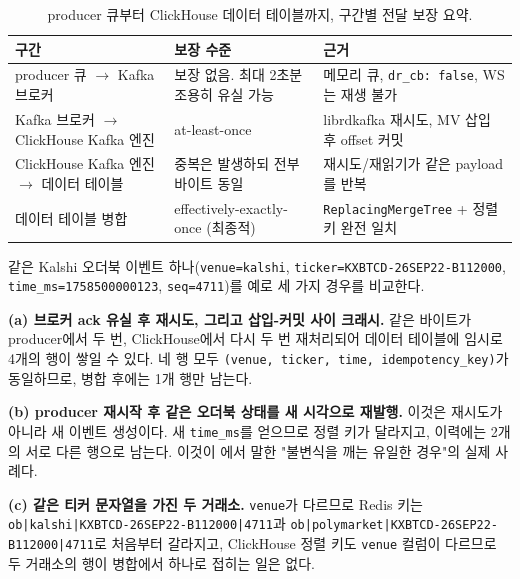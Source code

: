 \begin{table}[htbp]
  \centering
  \small
  \begin{tabularx}{\linewidth}{@{}lXX@{}}
    \toprule
    구간 & 보장 수준 & 근거 \\
    \midrule
    producer 큐 $\to$ Kafka 브로커 & 보장 없음. 최대 2초분 조용히 유실 가능 &
      메모리 큐, \texttt{dr\_cb: false}, WS는 재생 불가 \\
    Kafka 브로커 $\to$ ClickHouse Kafka 엔진 & at-least-once &
      librdkafka 재시도, MV 삽입 후 offset 커밋 \\
    ClickHouse Kafka 엔진 $\to$ 데이터 테이블 & 중복은 발생하되 전부 바이트 동일 &
      재시도/재읽기가 같은 payload를 반복 \\
    데이터 테이블 병합 & effectively-exactly-once (최종적) &
      \texttt{ReplacingMergeTree} + 정렬 키 완전 일치 \\
    \bottomrule
  \end{tabularx}
  \caption{producer 큐부터 ClickHouse 데이터 테이블까지, 구간별 전달 보장 요약.}
  \label{tab:delivery-summary}
\end{table}

\begin{example}
\label{ex:delivery-scenarios}
같은 Kalshi 오더북 이벤트 하나(\texttt{venue=kalshi},
\texttt{ticker=KXBTCD-26SEP22-B112000}, \texttt{time\_ms=1758500000123},
\texttt{seq=4711})를 예로 세 가지 경우를 비교한다.

\textbf{(a) 브로커 ack 유실 후 재시도, 그리고 삽입-커밋 사이 크래시.} 같은 바이트가
producer에서 두 번, ClickHouse에서 다시 두 번 재처리되어 데이터 테이블에 임시로
4개의 행이 쌓일 수 있다. 네 행 모두 \texttt{(venue, ticker, time,
idempotency\_key)}가 동일하므로, 병합 후에는 1개 행만 남는다.

\textbf{(b) producer 재시작 후 같은 오더북 상태를 새 시각으로 재발행.} 이것은
재시도가 아니라 새 이벤트 생성이다. 새 \texttt{time\_ms}를 얻으므로 정렬 키가
달라지고, 이력에는 2개의 서로 다른 행으로 남는다. 이것이
에서 말한 "불변식을 깨는 유일한 경우"의 실제 사례다.

\textbf{(c) 같은 티커 문자열을 가진 두 거래소.} \texttt{venue}가 다르므로
Redis 키는 \texttt{ob|kalshi|KXBTCD-26SEP22-B112000|4711}과
\texttt{ob|polymarket|KXBTCD-26SEP22-B112000|4711}로 처음부터 갈라지고, ClickHouse
정렬 키도 \texttt{venue} 컬럼이 다르므로 두 거래소의 행이 병합에서 하나로 접히는
일은 없다.
\end{example}

